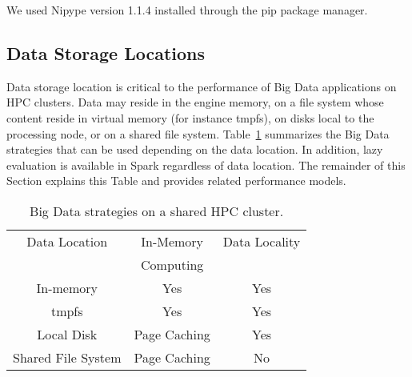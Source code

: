 \documentclass{IEEEtran}
\begin{document}
We used Nipype version 1.1.4 installed through the pip package manager.


\subsection{Data Storage Locations}

Data storage location is critical to the performance of Big Data 
applications on HPC clusters.
Data may reside in the engine memory, on 
a file system whose content reside in virtual memory (for instance 
tmpfs), on disks local to the processing node, or on a shared 
file system. Table~\ref{table:features} summarizes the Big Data 
strategies that can be used depending on the data location. In 
addition, lazy evaluation is available in Spark regardless of data 
location. The remainder of this Section explains this Table and 
provides related performance models.
\begin{table}
\centering
\begin{tabular}{c|cc}
   \rowcolor{headcolor}
    Data Location                 & In-Memory     & Data Locality        \\
    \rowcolor{headcolor}
                                  & Computing     &                     \\
                                  \hline          
In-memory                         & \cellcolor{green!25} Yes           & \cellcolor{green!25}Yes                      \\
tmpfs                             & \cellcolor{green!25} Yes           & \cellcolor{green!25}Yes                  \\
Local Disk                        & \cellcolor{orange!25}Page Caching  & \cellcolor{green!25}Yes                  \\
Shared File System                & \cellcolor{orange!25}Page Caching  & \cellcolor{red!25}No                
\end{tabular}
\caption{Big Data strategies on a shared HPC cluster.}
\label{table:features}
\end{table}
\end{document}
